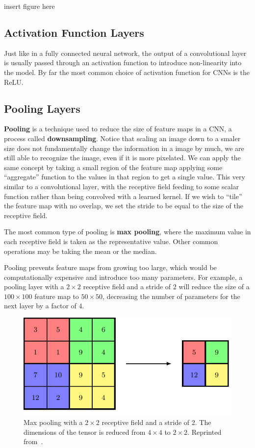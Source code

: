 \documentclass[12pt]{report}
\theoremstyle{definition}
\theoremstyle{remark}
\begin{document}
insert figure here

\subsection{Activation Function Layers}
Just like in a fully connected neural network, the output of a convolutional layer is usually passed through an activation function to introduce non-linearity into the model. By far the most common choice of activation function for CNNs is the ReLU\@.

\subsection{Pooling Layers}
\textbf{Pooling} is a technique used to reduce the size of feature maps in a CNN, a process called \textbf{downsampling}. Notice that scaling an image down to a smaler size does not fundamentally change the information in a image by much, we are still able to recognize the image, even if it is more pixelated. We can apply the same concept by taking a small region of the feature map applying some ``aggregate'' function to the values in that region to get a single value. This very similar to a convolutional layer, with the receptive field feeding to some scalar function rather than being convolved with a learned kernel. If we wish to ``tile'' the feature map with no overlap, we set the stride to be equal to the size of the receptive field.

The most common type of pooling is \textbf{max pooling}, where the maximum value in each receptive field is taken as the representative value. Other common operations may be taking the mean or the median.

Pooling prevents feature maps from growing too large, which would be computationally expensive and introduce too many parameters. For example, a pooling layer with a $2 \times 2$ receptive field and a stride of $2$ will reduce the size of a $100 \times 100$ feature map to $50 \times 50$, decreasing the number of parameters for the next layer by a factor of $4$.

\begin{figure}[h]
    \centering
    \includegraphics[width=0.7\linewidth]{figs/max_pooling.pdf}
    \caption{Max pooling with a $2 \times 2$ receptive field and a stride of $2$. The dimensions of the tensor is reduced from $4 \times 4$ to $2 \times 2$. Reprinted from~\cite{bishop_deep_2023}.}
    \label{fig:max-pooling}
\end{figure}
\end{document}
